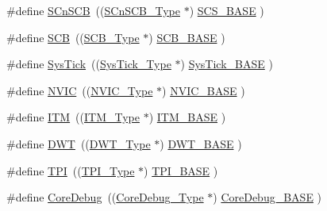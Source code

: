 \begin{DoxyCompactItemize}
\item 
\#define \hyperlink{group___c_m_s_i_s__core__base_ga9fe0cd2eef83a8adad94490d9ecca63f}{S\+Cn\+S\+CB}~((\hyperlink{struct_s_cn_s_c_b___type}{S\+Cn\+S\+C\+B\+\_\+\+Type}    $\ast$)     \hyperlink{group___c_m_s_i_s__core__base_ga3c14ed93192c8d9143322bbf77ebf770}{S\+C\+S\+\_\+\+B\+A\+SE}         )
\item 
\#define \hyperlink{group___c_m_s_i_s__core__base_gaaaf6477c2bde2f00f99e3c2fd1060b01}{S\+CB}~((\hyperlink{struct_s_c_b___type}{S\+C\+B\+\_\+\+Type}       $\ast$)     \hyperlink{group___c_m_s_i_s__core__base_gad55a7ddb8d4b2398b0c1cfec76c0d9fd}{S\+C\+B\+\_\+\+B\+A\+SE}         )
\item 
\#define \hyperlink{group___c_m_s_i_s__core__base_gacd96c53beeaff8f603fcda425eb295de}{Sys\+Tick}~((\hyperlink{struct_sys_tick___type}{Sys\+Tick\+\_\+\+Type}   $\ast$)     \hyperlink{group___c_m_s_i_s__core__base_ga58effaac0b93006b756d33209e814646}{Sys\+Tick\+\_\+\+B\+A\+SE}     )
\item 
\#define \hyperlink{group___c_m_s_i_s__core__base_gac8e97e8ce56ae9f57da1363a937f8a17}{N\+V\+IC}~((\hyperlink{struct_n_v_i_c___type}{N\+V\+I\+C\+\_\+\+Type}      $\ast$)     \hyperlink{group___c_m_s_i_s__core__base_gaa0288691785a5f868238e0468b39523d}{N\+V\+I\+C\+\_\+\+B\+A\+SE}        )
\item 
\#define \hyperlink{group___c_m_s_i_s__core__base_gabae7cdf882def602cb787bb039ff6a43}{I\+TM}~((\hyperlink{struct_i_t_m___type}{I\+T\+M\+\_\+\+Type}       $\ast$)     \hyperlink{group___c_m_s_i_s__core__base_gadd76251e412a195ec0a8f47227a8359e}{I\+T\+M\+\_\+\+B\+A\+SE}         )
\item 
\#define \hyperlink{group___c_m_s_i_s__core__base_gabbe5a060185e1d5afa3f85b14e10a6ce}{D\+WT}~((\hyperlink{struct_d_w_t___type}{D\+W\+T\+\_\+\+Type}       $\ast$)     \hyperlink{group___c_m_s_i_s__core__base_gafdab534f961bf8935eb456cb7700dcd2}{D\+W\+T\+\_\+\+B\+A\+SE}         )
\item 
\#define \hyperlink{group___c_m_s_i_s__core__base_ga8b4dd00016aed25a0ea54e9a9acd1239}{T\+PI}~((\hyperlink{struct_t_p_i___type}{T\+P\+I\+\_\+\+Type}       $\ast$)     \hyperlink{group___c_m_s_i_s__core__base_ga2b1eeff850a7e418844ca847145a1a68}{T\+P\+I\+\_\+\+B\+A\+SE}         )
\item 
\#define \hyperlink{group___c_m_s_i_s__core__base_gab6e30a2b802d9021619dbb0be7f5d63d}{Core\+Debug}~((\hyperlink{struct_core_debug___type}{Core\+Debug\+\_\+\+Type} $\ast$)     \hyperlink{group___c_m_s_i_s__core__base_ga680604dbcda9e9b31a1639fcffe5230b}{Core\+Debug\+\_\+\+B\+A\+SE}   )

\end{DoxyCompactItemize}
